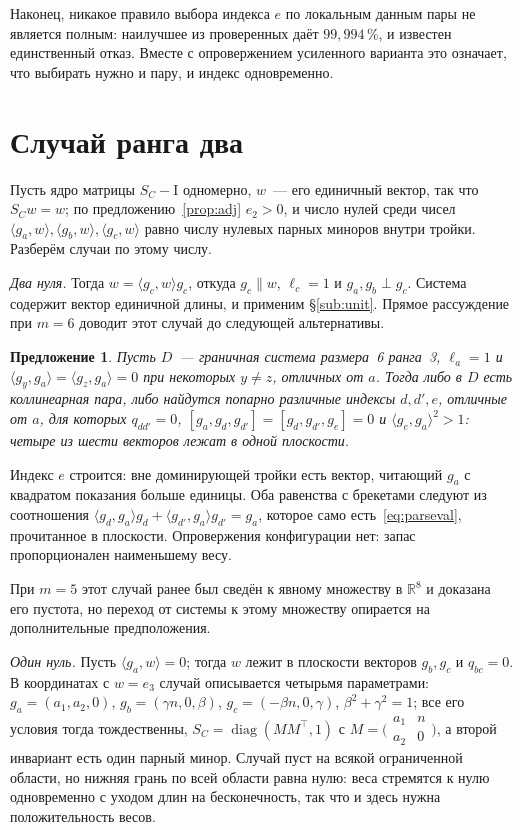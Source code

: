 \documentclass[11pt,a4paper]{article}
\theoremstyle{plain}
\newtheorem{proposition}[theorem]{Предложение}
\theoremstyle{definition}
\theoremstyle{remark}
\newcommand{\RR}{\mathbb{R}}
\newcommand{\Id}{\mathrm{I}}
\newcommand{\T}{^{\!\top}}
\begin{document}
Наконец, никакое правило выбора индекса $e$ по локальным данным пары не
является полным: наилучшее из проверенных даёт $99{,}994\,\%$, и известен
единственный отказ. Вместе с опровержением усиленного варианта это означает,
что выбирать нужно и пару, и индекс одновременно.

\section{Случай ранга два}\label{sec:line}

Пусть ядро матрицы $S_C-\Id$ одномерно, $w$~--- его единичный вектор, так
что $S_Cw=w$; по предложению~\ref{prop:adj} $e_2>0$, и число нулей среди
чисел $\langle g_a,w\rangle,\langle g_b,w\rangle,\langle g_c,w\rangle$ равно
числу нулевых парных миноров внутри тройки. Разберём случаи по этому числу.

\emph{Два нуля.} Тогда $w=\langle g_c,w\rangle g_c$, откуда $g_c\parallel w$,
$\ell_c=1$ и $g_a,g_b\perp g_c$. Система содержит вектор единичной длины, и
применим \S\ref{sub:unit}. Прямое рассуждение при $m=6$ доводит этот случай до
следующей альтернативы.

\begin{proposition}\label{prop:twoplane}
Пусть $D$~--- граничная система размера~6 ранга~3, $\ell_a=1$ и
$\langle g_y,g_a\rangle=\langle g_z,g_a\rangle=0$ при некоторых $y\ne z$,
отличных от $a$. Тогда либо в $D$ есть коллинеарная пара, либо найдутся попарно различные
индексы $d,d',e$, отличные от $a$, для которых $q_{dd'}=0$,
$[g_a,g_d,g_{d'}]=[g_d,g_{d'},g_e]=0$ и $\langle g_e,g_a\rangle^2>1$: четыре из
шести векторов лежат в одной плоскости.
\end{proposition}

Индекс $e$ строится: вне доминирующей тройки есть вектор, читающий $g_a$ с
квадратом показания больше единицы. Оба равенства с брекетами следуют из
соотношения $\langle g_d,g_a\rangle g_d+\langle g_{d'},g_a\rangle g_{d'}=g_a$,
которое само есть~\eqref{eq:parseval}, прочитанное в плоскости. Опровержения
конфигурации нет: запас пропорционален наименьшему весу.

При $m=5$ этот случай ранее был сведён к явному множеству в $\RR^8$ и доказана
его пустота, но переход от системы к этому множеству опирается на
дополнительные предположения.

\emph{Один нуль.} Пусть $\langle g_a,w\rangle=0$; тогда $w$ лежит в
плоскости векторов $g_b,g_c$ и $q_{bc}=0$. В координатах с $w=e_3$
случай описывается четырьмя параметрами: $g_a=(a_1,a_2,0)$,
$g_b=(\gamma n,0,\beta)$, $g_c=(-\beta n,0,\gamma)$, $\beta^2+\gamma^2=1$; все его
условия тогда тождественны, $S_C=\operatorname{diag}(MM\T,1)$ с
$M=\bigl(\begin{smallmatrix}a_1&n\\a_2&0\end{smallmatrix}\bigr)$, а второй
инвариант есть один парный минор. Случай пуст на всякой ограниченной области,
но нижняя грань по всей области равна нулю: веса стремятся к нулю одновременно
с уходом длин на бесконечность, так что и здесь нужна положительность весов.
\end{document}
